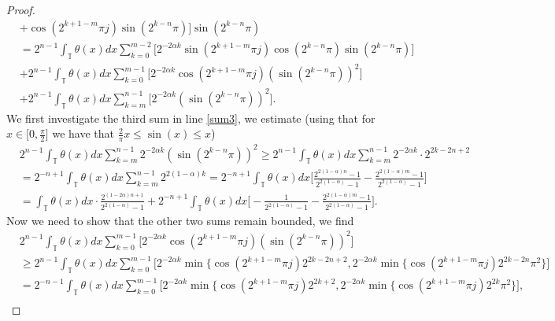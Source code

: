 \documentclass[12pt,a4paper]{article}
\theoremstyle{definition}
\theoremstyle{remark}
\numberwithin{equation}{section}
\begin{document}
\begin{appendices}
\begin{proof}
\begin{align}
&+ \cos ( 2^{k+1 - m} \pi j) \sin (2^{k-n} \pi ) \bigg] \sin (2^{k-n} \pi ) \nonumber \\
&= 2^{n-1} \int_{\mathbb{T}} \theta (x) dx \sum_{k=0 }^{m-2} \bigg[ 2^{-2\alpha k} \sin ( 2^{k+1-m} \pi j) \cos (2^{k-n} \pi ) \sin (2^{k-n} \pi ) \bigg] \label{sum1} \\
&+ 2^{n-1} \int_{\mathbb{T}} \theta (x) dx \sum_{k=0 }^{m-1} \bigg[ 2^{-2\alpha k} \cos ( 2^{k+1-m} \pi j) (\sin (2^{k-n} \pi ))^2 \bigg] \label{sum2} \\
&+ 2^{n-1} \int_{\mathbb{T}} \theta (x) dx \sum_{k=m  }^{n-1} \bigg[ 2^{-2\alpha k} (\sin (2^{k-n} \pi ))^2 \bigg]. \label{sum3}
\end{align}
\endgroup
We first investigate the third sum in line \eqref{sum3}, we estimate (using that for $x \in \big[0, \frac{\pi}{2} \big]$ we have that $\frac{2}{\pi} x \leq \sin (x) \leq x$)
\begingroup
\allowdisplaybreaks
\begin{align*}
&2^{n-1} \int_{\mathbb{T}} \theta (x) dx \sum_{k=m  }^{n-1} 2^{-2\alpha k} (\sin (2^{k-n} \pi ))^2 \geq 2^{n-1} \int_{\mathbb{T}} \theta (x) dx \sum_{k=m  }^{n-1} 2^{-2\alpha k} \cdot 2^{2k-2n+2} \\
&= 2^{-n+1} \int_{\mathbb{T}} \theta (x) dx \sum_{k=m}^{n-1} 2^{2(1-\alpha) k} = 2^{-n+1} \int_{\mathbb{T}} \theta (x) dx \bigg[ \frac{ 2^{2(1-\alpha)n} - 1}{2^{2(1-\alpha)} - 1} - \frac{2^{2(1-\alpha)m} - 1}{2^{2(1-\alpha)} - 1} \bigg] \\
&= \int_{\mathbb{T}} \theta(x) dx \cdot  \frac{ 2^{(1 - 2\alpha)n + 1} }{2^{2(1-\alpha)} - 1} + 2^{-n+1} \int_{\mathbb{T}} \theta (x) dx \bigg[ -\frac{  1}{2^{2(1-\alpha)} - 1} - \frac{2^{2(1-\alpha)m} - 1}{2^{2(1-\alpha)} - 1} \bigg].
\end{align*}
\endgroup
Now we need to show that the other two sums remain bounded, we find
\begingroup
\allowdisplaybreaks
\begin{align*}
&2^{n-1} \int_{\mathbb{T}} \theta (x) dx \sum_{k=0 }^{m-1} \bigg[ 2^{-2\alpha k} \cos ( 2^{k+1-m} \pi j) (\sin (2^{k-n} \pi ))^2 \bigg] \\
&\geq 2^{n-1} \int_{\mathbb{T}} \theta (x) dx \sum_{k=0 }^{m-1} \bigg[ 2^{-2\alpha k} \min \{ \cos ( 2^{k+1-m} \pi j) 2^{2k-2n+2}, 2^{-2\alpha k} \min \{ \cos ( 2^{k+1-m} \pi j) 2^{2k-2n} \pi^2  \} \bigg] \\
&= 2^{-n-1} \int_{\mathbb{T}} \theta (x) dx \sum_{k=0 }^{m-1} \bigg[ 2^{-2\alpha k} \min \{ \cos ( 2^{k+1-m} \pi j) 2^{2k+2}, 2^{-2\alpha k} \min \{ \cos ( 2^{k+1-m} \pi j) 2^{2k} \pi^2  \} \bigg], \\

\end{align*}
\end{proof}
\end{appendices}
\end{document}
